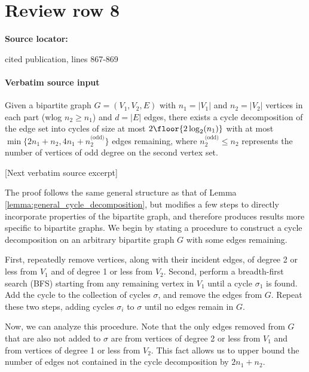 \documentclass[10pt]{article}
\begin{document}
\section*{Review row 8}
\textbf{Source locator:} {\footnotesize\raggedright cited publication, lines 867-\allowbreak{}869\par}
\paragraph{Verbatim source input}
\begin{ReviewVerbatim}
\begin{lemma}\label{lemma:bipartite_cycle_decomposition}
			Given a bipartite graph $G = (V_1, V_2, E)$ with $n_1 = |V_1|$ and $n_2 = |V_2|$ vertices in each part (wlog $n_2 \geq n_1$) and $d = |E|$ edges, there exists a cycle decomposition of the edge set into cycles of size at most $2 \floor{2 \log_2(n_1)}$ with at most $\min\{2n_1 + n_2, 4n_1 + n_2^\text{(odd)}\}$ edges remaining, where $n_2^\text{(odd)} \leq n_2$ represents the number of vertices of odd degree on the second vertex set.
		\end{lemma}

[Next verbatim source excerpt]

			The proof follows the same general structure as that of Lemma \ref{lemma:general_cycle_decomposition}, but modifies a few steps to directly incorporate properties of the bipartite graph, and therefore produces results more specific to bipartite graphs. We begin by stating a procedure to construct a cycle decomposition on an arbitrary bipartite graph $G$ with some edges remaining.

			First, repeatedly remove vertices, along with their incident edges, of degree 2 or less from $V_1$ and of degree 1 or less from $V_2$. Second, perform a breadth-first search (BFS) starting from any remaining vertex in $V_1$ until a cycle $\sigma_1$ is found. Add the cycle to the collection of cycles $\sigma$, and remove the edges from $G$. Repeat these two steps, adding cycles $\sigma_i$ to $\sigma$ until no edges remain in $G$.

			Now, we can analyze this procedure. Note that the only edges removed from $G$ that are also not added to $\sigma$ are from vertices of degree 2 or less from $V_1$ and from vertices of degree 1 or less from $V_2$. This fact allows us to upper bound the number of edges not contained in the cycle decomposition by $2n_1 + n_2$.


\end{ReviewVerbatim}
\end{document}
